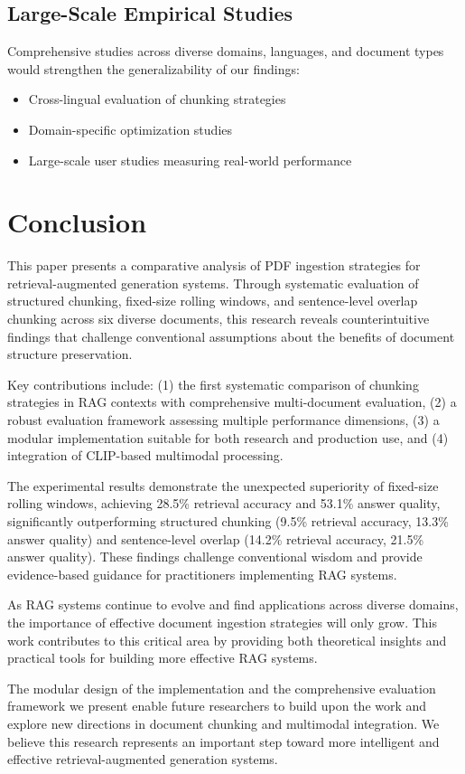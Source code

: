 \documentclass[11pt,a4paper]{article}
\begin{document}
\subsection{Large-Scale Empirical Studies}

Comprehensive studies across diverse domains, languages, and document types would strengthen the generalizability of our findings:

\begin{itemize}
\item Cross-lingual evaluation of chunking strategies
\item Domain-specific optimization studies
\item Large-scale user studies measuring real-world performance
\end{itemize}

\section{Conclusion}

This paper presents a comparative analysis of PDF ingestion strategies for retrieval-augmented generation systems. Through systematic evaluation of structured chunking, fixed-size rolling windows, and sentence-level overlap chunking across six diverse documents, this research reveals counterintuitive findings that challenge conventional assumptions about the benefits of document structure preservation.

Key contributions include: (1) the first systematic comparison of chunking strategies in RAG contexts with comprehensive multi-document evaluation, (2) a robust evaluation framework assessing multiple performance dimensions, (3) a modular implementation suitable for both research and production use, and (4) integration of CLIP-based multimodal processing.

The experimental results demonstrate the unexpected superiority of fixed-size rolling windows, achieving 28.5\% retrieval accuracy and 53.1\% answer quality, significantly outperforming structured chunking (9.5\% retrieval accuracy, 13.3\% answer quality) and sentence-level overlap (14.2\% retrieval accuracy, 21.5\% answer quality). These findings challenge conventional wisdom and provide evidence-based guidance for practitioners implementing RAG systems.

As RAG systems continue to evolve and find applications across diverse domains, the importance of effective document ingestion strategies will only grow. This work contributes to this critical area by providing both theoretical insights and practical tools for building more effective RAG systems.

The modular design of the implementation and the comprehensive evaluation framework we present enable future researchers to build upon the work and explore new directions in document chunking and multimodal integration. We believe this research represents an important step toward more intelligent and effective retrieval-augmented generation systems.



\end{document}
